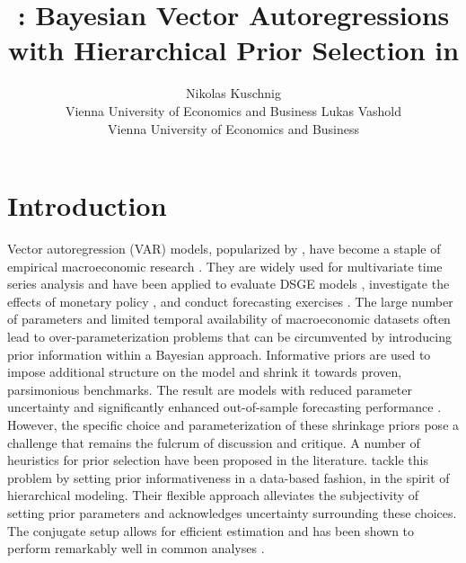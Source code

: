\documentclass[article,nojss]{jss} %
\author{Nikolas Kuschnig \\ Vienna University of Economics and Business \And
        \And Lukas Vashold \\ Vienna University of Economics and Business}
\title{\pkg{BVAR}: Bayesian Vector Autoregressions with Hierarchical Prior Selection in \proglang{R}}
\begin{document}






\section{Introduction} \label{sec:intro}

Vector autoregression (VAR) models, popularized by \cite{sims1980}, have become a staple of empirical macroeconomic research \citep{kilian2017}. They are widely used for multivariate time series analysis and have been applied to evaluate DSGE models \citep{del2007}, investigate the effects of monetary policy \citep{bernanke2005, sims2006}, and conduct forecasting exercises \citep{litterman1986, koop2013}.
The large number of parameters and limited temporal availability of macroeconomic datasets often lead to over-parameterization problems \citep{koop2010} that can be circumvented by introducing prior information within a Bayesian approach. Informative priors are used to impose additional structure on the model and shrink it towards proven, parsimonious benchmarks. The result are models with reduced parameter uncertainty and significantly enhanced out-of-sample forecasting performance \citep{koop2013}. However, the specific choice and parameterization of these shrinkage priors pose a challenge that remains the fulcrum of discussion and critique.
A number of heuristics for prior selection have been proposed in the literature.
\cite{giannone2015} tackle this problem by setting prior informativeness in a data-based fashion, in the spirit of hierarchical modeling. Their flexible approach alleviates the subjectivity of setting prior parameters and acknowledges uncertainty surrounding these choices. The conjugate setup allows for efficient estimation and has been shown to perform remarkably well in common analyses \citep[see][]{miranda-agrippino2015, baumeister2016}.
\end{document}
